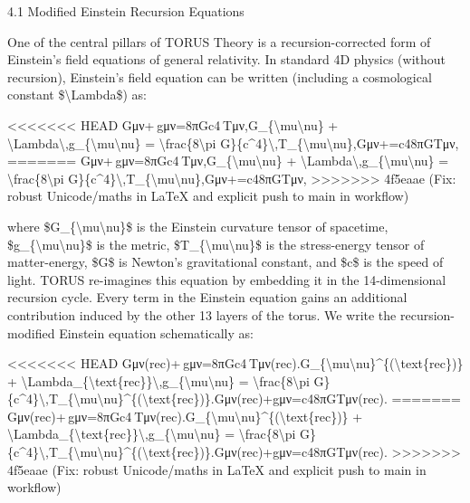 \documentclass[]{article}
\begin{document}
4.1 Modified Einstein Recursion Equations

One of the central pillars of TORUS Theory is a recursion-corrected form
of Einstein's field equations of general relativity. In standard 4D
physics (without recursion), Einstein's field equation can be written
(including a cosmological constant \$\textbackslash{}Lambda\$) as:

<<<<<<< HEAD
Gμν+\Lambda gμν=8πGc4 Tμν,G\_\{\textbackslash mu\textbackslash nu\} +
\textbackslash Lambda\textbackslash,g\_\{\textbackslash mu\textbackslash nu\}
= \textbackslash frac\{8\textbackslash pi
G\}\{c\^{}4\}\textbackslash,T\_\{\textbackslash mu\textbackslash nu\},Gμν\hspace{0pt}+\hspace{0pt}=c48πG\hspace{0pt}Tμν\hspace{0pt},
=======
Gμν+\Lambda gμν=8πGc4 Tμν,G\_\{\textbackslash{}mu\textbackslash{}nu\} +
\textbackslash{}Lambda\textbackslash{},g\_\{\textbackslash{}mu\textbackslash{}nu\}
= \textbackslash{}frac\{8\textbackslash{}pi
G\}\{c\^{}4\}\textbackslash{},T\_\{\textbackslash{}mu\textbackslash{}nu\},Gμν​+​=c48πG​Tμν​,
>>>>>>> 4f5eaae (Fix: robust Unicode/maths in LaTeX and explicit push to main in workflow)

where \$G\_\{\textbackslash{}mu\textbackslash{}nu\}\$ is the Einstein
curvature tensor of spacetime,
\$g\_\{\textbackslash{}mu\textbackslash{}nu\}\$ is the metric,
\$T\_\{\textbackslash{}mu\textbackslash{}nu\}\$ is the stress-energy
tensor of matter-energy, \$G\$ is Newton's gravitational constant, and
\$c\$ is the speed of light. TORUS re-imagines this equation by
embedding it in the 14-dimensional recursion cycle. Every term in the
Einstein equation gains an additional contribution induced by the other
13 layers of the torus. We write the recursion-modified Einstein
equation schematically as:

<<<<<<< HEAD
Gμν(rec)+\Lambdarec gμν=8πGc4 Tμν(rec).G\_\{\textbackslash mu\textbackslash nu\}\^{}\{(\textbackslash text\{rec\})\}
+
\textbackslash Lambda\_\{\textbackslash text\{rec\}\}\textbackslash,g\_\{\textbackslash mu\textbackslash nu\}
= \textbackslash frac\{8\textbackslash pi
G\}\{c\^{}4\}\textbackslash,T\_\{\textbackslash mu\textbackslash nu\}\^{}\{(\textbackslash text\{rec\})\}.Gμν(rec)\hspace{0pt}+\Lambdarec\hspace{0pt}gμν\hspace{0pt}=c48πG\hspace{0pt}Tμν(rec)\hspace{0pt}.
=======
Gμν(rec)+\Lambdarec gμν=8πGc4 Tμν(rec).G\_\{\textbackslash{}mu\textbackslash{}nu\}\^{}\{(\textbackslash{}text\{rec\})\}
+
\textbackslash{}Lambda\_\{\textbackslash{}text\{rec\}\}\textbackslash{},g\_\{\textbackslash{}mu\textbackslash{}nu\}
= \textbackslash{}frac\{8\textbackslash{}pi
G\}\{c\^{}4\}\textbackslash{},T\_\{\textbackslash{}mu\textbackslash{}nu\}\^{}\{(\textbackslash{}text\{rec\})\}.Gμν(rec)​+\Lambdarec​gμν​=c48πG​Tμν(rec)​.
>>>>>>> 4f5eaae (Fix: robust Unicode/maths in LaTeX and explicit push to main in workflow)
\end{document}
